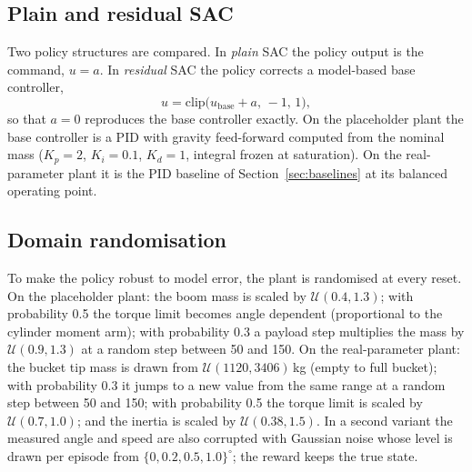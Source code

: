 \subsection{Plain and residual SAC}
Two policy structures are compared.
In \emph{plain} SAC the policy output is the command, $u=a$.
In \emph{residual} SAC the policy corrects a model-based base controller,
\begin{equation}
u = \mathrm{clip}\big(u_\mathrm{base} + a,\,-1,\,1\big),
\label{eq:residual}
\end{equation}
so that $a=0$ reproduces the base controller exactly.
On the placeholder plant the base controller is a PID with gravity feed-forward computed from
the nominal mass ($K_p=2$, $K_i=0.1$, $K_d=1$, integral frozen at saturation).
On the real-parameter plant it is the PID baseline of Section~\ref{sec:baselines} at its
balanced operating point.

\subsection{Domain randomisation}
To make the policy robust to model error, the plant is randomised at every reset.
On the placeholder plant: the boom mass is scaled by $\mathcal{U}(0.4,1.3)$; with probability 0.5
the torque limit becomes angle dependent (proportional to the cylinder moment arm); with
probability 0.3 a payload step multiplies the mass by $\mathcal{U}(0.9,1.3)$ at a random step
between 50 and 150.
On the real-parameter plant: the bucket tip mass is drawn from $\mathcal{U}(1120,3406)$\,kg
(empty to full bucket); with probability 0.3 it jumps to a new value from the same range at a
random step between 50 and 150; with probability 0.5 the torque limit is scaled by
$\mathcal{U}(0.7,1.0)$; and the inertia is scaled by $\mathcal{U}(0.38,1.5)$.
In a second variant the measured angle and speed are also corrupted with Gaussian noise whose
level is drawn per episode from $\{0, 0.2, 0.5, 1.0\}^\circ$; the reward keeps the true state.


